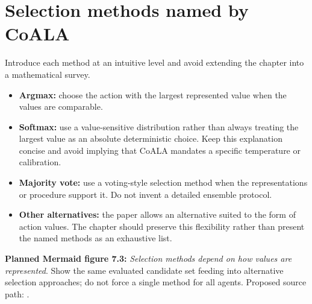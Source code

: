 \section{Selection methods named by CoALA}
Introduce each method at an intuitive level and avoid extending the chapter into a mathematical survey.
\begin{itemize}
  \item \textbf{Argmax:} choose the action with the largest represented value when the values are comparable.
  \item \textbf{Softmax:} use a value-sensitive distribution rather than always treating the largest value as an absolute deterministic choice. Keep this explanation concise and avoid implying that CoALA mandates a specific temperature or calibration.
  \item \textbf{Majority vote:} use a voting-style selection method when the representations or procedure support it. Do not invent a detailed ensemble protocol.
  \item \textbf{Other alternatives:} the paper allows an alternative suited to the form of action values. The chapter should preserve this flexibility rather than present the named methods as an exhaustive list.
\end{itemize}
\textbf{Planned Mermaid figure 7.3:} \emph{Selection methods depend on how values are represented}. Show the same evaluated candidate set feeding into alternative selection approaches; do not force a single method for all agents. Proposed source path: .

